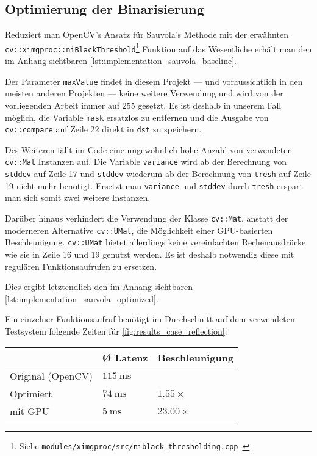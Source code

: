 \subsection{Optimierung der Binarisierung}%
\label{subsec:implementation_preprocess_binarization_optimization}

Reduziert man OpenCV's Ansatz für Sauvola's Methode mit der erwähnten \texttt{cv::ximgproc::niBlackThreshold}\footnote{Siehe \texttt{modules/ximgproc/src/niblack\_thresholding.cpp}~\cite{opencv_contrib_source}} Funktion auf das Wesentliche erhält man den im Anhang sichtbaren \autoref{lst:implementation_sauvola_baseline}.

Der Parameter \texttt{maxValue} findet in diesem Projekt --- und voraussichtlich in den meisten anderen Projekten --- keine weitere Verwendung und wird von der vorliegenden Arbeit immer auf \(255\) gesetzt.
Es ist deshalb in unserem Fall möglich, die Variable \texttt{mask} ersatzlos zu entfernen und die Ausgabe von \texttt{cv::compare} auf Zeile 22 direkt in \texttt{dst} zu speichern.

Des Weiteren fällt im Code eine ungewöhnlich hohe Anzahl von verwendeten \texttt{cv::Mat} Instanzen auf.
Die Variable \texttt{variance} wird ab der Berechnung von \texttt{stddev} auf Zeile 17 und \texttt{stddev} wiederum ab der Berechnung von \texttt{tresh} auf Zeile 19 nicht mehr benötigt.
Ersetzt man \texttt{variance} und \texttt{stddev} durch \texttt{tresh} erspart man sich somit zwei weitere Instanzen.

Darüber hinaus verhindert die Verwendung der Klasse \texttt{cv::Mat}, anstatt der moderneren Alternative \texttt{cv::UMat}, die Möglichkeit einer GPU-basierten Beschleunigung.
\texttt{cv::UMat} bietet allerdings keine vereinfachten Rechenausdrücke, wie sie in Zeile 16 und 19 genutzt werden.
Es ist deshalb notwendig diese mit regulären Funktionsaufrufen zu ersetzen.

Dies ergibt letztendlich den im Anhang sichtbaren \autoref{lst:implementation_sauvola_optimized}.

Ein einzelner Funktionsaufruf benötigt im Durchschnitt auf dem verwendeten Testsystem folgende Zeiten für \autoref{fig:results_case_reflection}\systemfootnote{}:

\begin{tabu}{l|l|l}
    & Ø Latenz & Beschleunigung \\
    \midrule
    Original (OpenCV) & \(\SI{115}{\milli\second}\) & \\
    Optimiert & \(\SI{74}{\milli\second}\) & \(\num{1.55}\times\) \\ %
    \ditto{} mit GPU & \(\SI{5}{\milli\second}\) & \(\num{23.00}\times\) %
\end{tabu}


